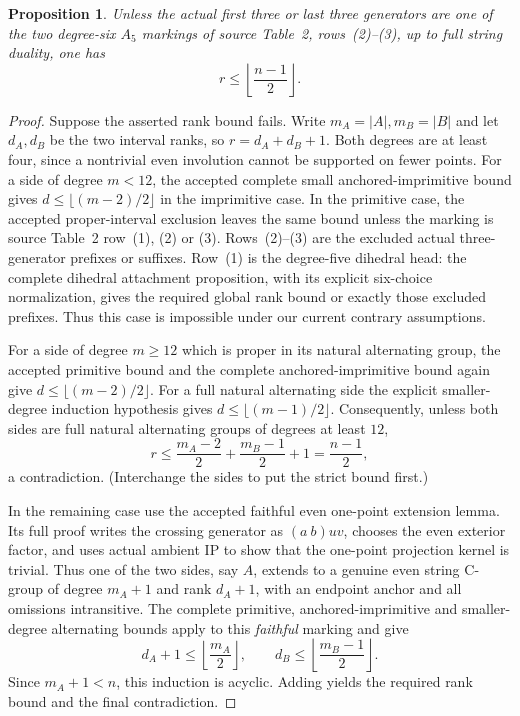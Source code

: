 \documentclass[10pt,a4paper]{article}
\newtheorem{proposition}{Proposition}
\begin{document}
\begin{proposition}
Unless the actual first three or last three generators are one
of the two degree-six $A_5$ markings of source Table~2,
rows~(2)--(3), up to full string duality, one has
\[
                     r\leq\left\lfloor\frac{n-1}{2}\right\rfloor.
\]
\end{proposition}
\begin{proof}
Suppose the asserted rank bound fails. Write
$m_A=|A|,m_B=|B|$ and let $d_A,d_B$ be the two interval
ranks, so $r=d_A+d_B+1$. Both degrees are at least four,
since a nontrivial even involution cannot be supported on
fewer points.
For a side of degree $m<12$, the accepted complete small
anchored-imprimitive bound gives $d\leq\lfloor(m-2)/2\rfloor$
in the imprimitive case. In the primitive case, the accepted
proper-interval exclusion leaves the same bound unless the
marking is source Table~2 row~(1), (2) or (3).
Rows~(2)--(3) are the excluded actual three-generator
prefixes or suffixes. Row~(1) is the degree-five dihedral
head: the complete dihedral attachment proposition,
with its explicit six-choice normalization, gives the
required global rank bound or exactly those excluded
prefixes. Thus this case is impossible under our current
contrary assumptions.

For a side of degree $m\geq12$ which is proper in its
natural alternating group, the accepted primitive bound
and the complete anchored-imprimitive bound again give
$d\leq\lfloor(m-2)/2\rfloor$. For a full natural alternating
side the explicit smaller-degree induction hypothesis gives
$d\leq\lfloor(m-1)/2\rfloor$.
Consequently, unless both sides are full natural alternating
groups of degrees at least $12$,
\[
 r\leq\frac{m_A-2}{2}+\frac{m_B-1}{2}+1
     =\frac{n-1}{2},
\]
a contradiction. (Interchange the sides to put the strict
bound first.)

In the remaining case use the accepted faithful even
one-point extension lemma. Its full proof writes the
crossing generator as $(a\ b)uv$, chooses the even exterior
factor, and uses actual ambient IP to show that the
one-point projection kernel is trivial. Thus one of the
two sides, say $A$, extends to a genuine even string C-group
of degree $m_A+1$ and rank $d_A+1$, with an endpoint anchor
and all omissions intransitive. The complete primitive,
anchored-imprimitive and smaller-degree alternating bounds
apply to this \emph{faithful} marking and give
\[
 d_A+1\leq\left\lfloor\frac{m_A}{2}\right\rfloor,
 \qquad d_B\leq\left\lfloor\frac{m_B-1}{2}\right\rfloor.
\]
Since $m_A+1<n$, this induction is acyclic. Adding yields
the required rank bound and the final contradiction.
\end{proof}
\end{document}
